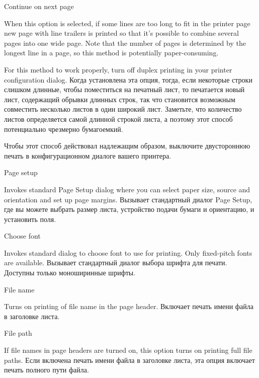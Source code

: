 \begin{popup}
\caption{Continue on next page}
\ifenglish
When this option is selected,
if some lines are too long to fit in the printer page new page with line trailers
is printed so that it's possible to combine several pages into one wide page.
Note that the number  of pages is determined by the longest line in a page,
so this method is potentially paper-consuming.

For this method to work properly, turn off duplex printing in your printer
configuration dialog.
\else
Когда установлена эта опция,
тогда, если некоторые строки слишком длинные, чтобы поместиться на печатный лист,
то печатается новый лист, содержащий обрывки длинных строк, так что становится 
возможным совместить несколько листов в один широкий лист. Заметьте, что 
количество листов определяется самой длинной строкой листа, а поэтому этот способ
потенциально чрезмерно бумагоемкий.

Чтобы этот способ действовал надлежащим образом, выключите двустороннюю печать
в конфигурационном диалоге вашего принтера. 
\fi
\end{popup}

\begin{popup}
\caption{Page setup}
\ifenglish
Invokes standard Page Setup dialog where you can select paper size, source and
orientation and set up page margins.
\else
Вызывает стандартный диалог Page Setup, где вы можете выбрать размер листа, устройство
подачи бумаги и ориентацию, и установить поля. 
\fi
\end{popup}

\begin{popup}
\caption{Choose font}
\ifenglish
Invokes standard dialog to choose font to use for printing. Only fixed-pitch
fonts are available.
\else
Вызывает стандартный диалог выбора шрифта для печати. Доступны только
моноширинные шрифты.
\fi
\end{popup}

\begin{popup}
\caption{File name}
\ifenglish
Turns on printing of file name in the page header.
\else
Включает печать имени файла в заголовке листа.
\fi
\end{popup}

\begin{popup}
\caption{File path}
\ifenglish
If file names in page headers are turned on, this option turns on printing full
file paths.
\else
Если включена печать имени файла в заголовке листа, эта опция включает печать
полного пути файла.
\fi
\end{popup}


